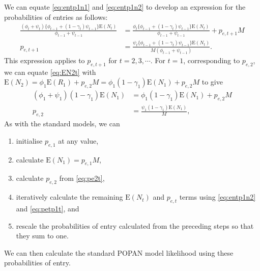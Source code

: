 \documentclass{article}
\newcommand{\E}[1]{\mathrm{E}(#1)}
\begin{document}
We can equate \eqref{eq:entp1n1} and \eqref{eq:entp1n2} to develop an
expression for the probabilities of entries as follows:
\begin{align}
  \frac{(\phi_t + \psi_t) \{ \phi_{t - 1} + (1 - \gamma_t) \psi_{t - 1}\}
    \E{N_t}}{\phi_{t - 1} + \psi_{t - 1}} &= \frac{\phi_t \{ \phi_{t - 1} + (1 - \gamma_t) \psi_{t - 1}\}
                                            \E{N_t}}{\phi_{t - 1} + \psi_{t - 1}} + p_{e, t + 1}M \\
  p_{e, t + 1} &= \frac{\psi_t \{ \phi_{t - 1} + (1 - \gamma_t)\psi_{t - 1} \} \E{N_t}}{M(\phi_{t - 1} + \psi_{t - 1})}. \label{eq:petp1t}
\end{align}
This expression applies to $p_{e, t + 1}$ for $t = 2, 3, \cdots$.  For
$t = 1$, corresponding to $p_{e, 2}$, we can equate \eqref{eq:EN2t}
with
$\E{N_2} = \phi_1\E{R_1} + p_{e, 2} M = \phi_1 (1 - \gamma_1) \E{N_1}
+ p_{e, 2}M$ to give
\begin{align}
  (\phi_1 + \psi_1) (1 - \gamma_1) \E{N_1} &= \phi_1 (1 - \gamma_1) \E{N_1}
                                             + p_{e, 2}M \\
  p_{e, 2} &= \frac{\psi_1 (1 - \gamma_1) \E{N_1}}{M}, \label{eq:pe2t}
\end{align}
As with the standard models, we can
\begin{enumerate}
\item initialise $p_{e, 1}$ at any
  value,
\item calculate $\E{N_1} = p_{e, 1} M$,
\item calculate $p_{e, 2}$
  from \eqref{eq:pe2t},
\item iteratively calculate the remaining
$\E{N_t}$ and $p_{e, t}$ terms using \eqref{eq:entp1n2} and
\eqref{eq:petp1t}, and
\item rescale the probabilities of entry
  calculated from the preceding steps so that they sum to one.
\end{enumerate}
We can then calculate the standard POPAN model likelihood using these
probabilities of entry.


 
\end{document}
